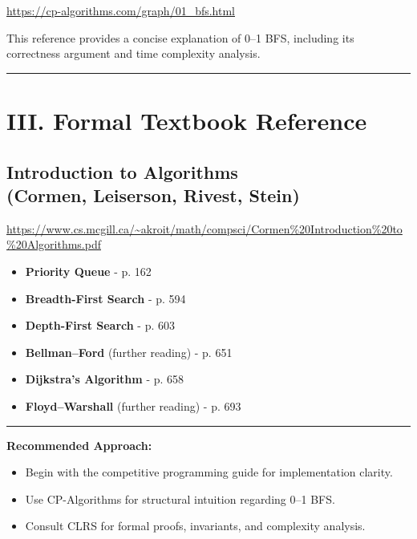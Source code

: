 \documentclass[11pt]{article}
\begin{document}
\url{https://cp-algorithms.com/graph/01_bfs.html}

\vspace{0.5em}

This reference provides a concise explanation of 0--1 BFS, including its correctness argument and time complexity analysis.

\vspace{1em}

\hrule
\vspace{1em}

\section*{III. Formal Textbook Reference}

\subsection*{Introduction to Algorithms \\ (Cormen, Leiserson, Rivest, Stein)}

\url{https://www.cs.mcgill.ca/~akroit/math/compsci/Cormen%20Introduction%20to%20Algorithms.pdf}

\vspace{0.8em}

\begin{itemize}
    \item \textbf{Priority Queue} - p. 162
    \item \textbf{Breadth-First Search} - p. 594
    \item \textbf{Depth-First Search} - p. 603
    \item \textbf{Bellman--Ford} (further reading) - p. 651
    \item \textbf{Dijkstra’s Algorithm} - p. 658
    \item \textbf{Floyd--Warshall} (further reading) - p. 693
\end{itemize}

\vspace{1em}

\hrule
\vspace{1em}

\noindent
\textbf{Recommended Approach:}
\begin{itemize}
    \item Begin with the competitive programming guide for implementation clarity.
    \item Use CP-Algorithms for structural intuition regarding 0--1 BFS.
    \item Consult CLRS for formal proofs, invariants, and complexity analysis.
\end{itemize}
\end{document}
